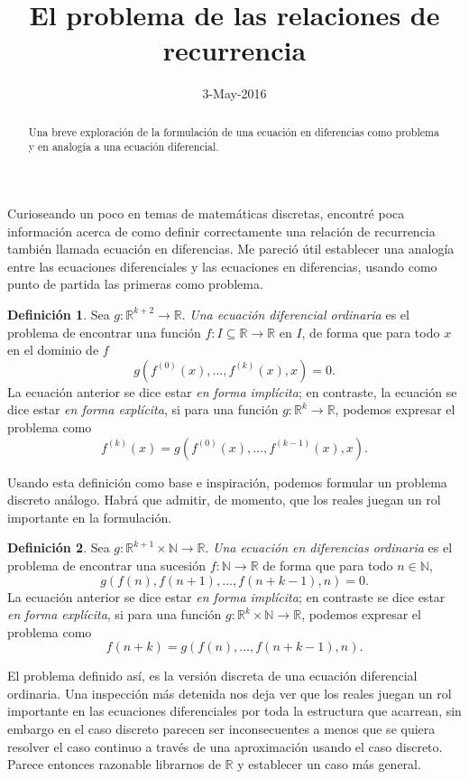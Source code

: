 \documentclass[letter,10pt,notitlepage]{amsart}
\title{El problema de las relaciones de recurrencia}
\date{3-May-2016}
\theoremstyle{definition}
\newtheorem{definition}{Definición}
\theoremstyle{remark}
\begin{document}
\begin{abstract}
  Una breve exploración de la formulación de
  una ecuación en diferencias como problema
  y en analogía a una ecuación diferencial.
\end{abstract}
\maketitle

Curioseando un poco en temas de matemáticas
discretas, encontré poca información acerca de
como definir correctamente una relación de recurrencia
también llamada ecuación en diferencias. Me pareció útil 
establecer una analogía entre las ecuaciones diferenciales
y las ecuaciones en diferencias, usando como punto de partida 
las primeras como  problema.

\begin{definition}
  Sea \( g \colon \mathbb{R}^{k+2} \to \mathbb{R}\). \emph{Una ecuación diferencial ordinaria}
  es el problema de encontrar una función \( f \colon I \subseteq \mathbb{R} \to \mathbb{R}\)
  en \( I\), de forma que para todo \( x\) en el dominio de \( f\)
  \[ g\left( f^{(0)}(x),\dots,f^{(k)}(x),x \right) = 0.\]
  La ecuación anterior se dice estar \emph{en forma implícita};
  en contraste, la ecuación se dice estar \emph{en forma explícita}, si para una función
  \( g \colon \mathbb{R}^k \to \mathbb{R}\), podemos expresar el problema
  como\[ f^{(k)}(x) = g\left( f^{(0)}(x),\dots,f^{(k-1)}(x),x \right).\]
\end{definition}

Usando esta definición como base e inspiración, podemos formular un problema
discreto análogo. Habrá que admitir, de momento, que los reales juegan un rol
importante en la formulación.

\begin{definition}
  Sea \( g \colon \mathbb{R}^{k+1} \times \mathbb{N} \to \mathbb{R}\).
  \emph{Una ecuación en diferencias ordinaria} es el problema de encontrar una
  sucesión \( f \colon \mathbb{N} \to \mathbb{R}\) de forma que
  para todo \( n \in \mathbb{N}\),
  \[ g(f(n), f(n+1), \dots, f(n+k-1),n) = 0.\]
  La ecuación anterior se dice estar \emph{en forma implícita}; en contraste
  se dice estar \emph{en forma explícita}, si para una función 
  \( g \colon \mathbb{R}^k \times \mathbb{N} \to \mathbb{R}\), 
  podemos expresar el problema como
  \[ f(n+k)=g( f(n), \dots, f(n+k-1),n).\]
\end{definition}

El problema definido así, es la versión discreta de una ecuación
diferencial ordinaria. Una inspección más detenida nos deja ver
que los reales juegan un rol importante en las ecuaciones diferenciales
por toda la estructura que acarrean, sin embargo en el caso discreto
parecen ser inconsecuentes a menos que se quiera resolver el caso
continuo a través de una aproximación usando el caso discreto.
Parece entonces razonable librarnos de \( \mathbb{R}\) y
establecer un caso más general.
\end{document}
